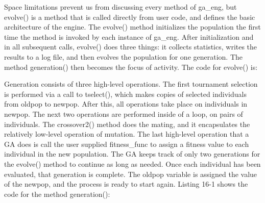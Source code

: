 Space limitations prevent us from discussing every method of
\textsf{ga\_eng}, but \textsf{evolve()} is a method that is called
directly from user code, and defines the basic architecture of the
engine. The \textsf{evolve()} method initializes the population the
first time the method is invoked by each instance of \textsf{ga\_eng}.
After initialization and in all subsequent calls, \textsf{evolve()}
does three things: it collects statistics, writes the results to a log
file, and then evolves the population for one generation. The method
\textsf{generation()} then becomes the focus of activity. The code for
\textsf{evolve()} is:


Generation consists of three high-level operations. The first tournament
selection is performed via a call to \textsf{tselect()}, which makes
copies of selected individuals from \textsf{oldpop} to
\textsf{newpop}.
After this, all operations take place on individuals in
\textsf{newpop}. The next two operations are performed inside of a
loop, on pairs of individuals. The \textsf{crossover2()} method does
the mating, and it encapsulates the relatively low-level operation of
mutation. The last high-level operation that a GA does is call the user
supplied \textsf{fitness\_func} to assign a fitness value to each
individual in the new population. The GA keeps track of only two
generations for the \textsf{evolve()} method to continue as long as
needed. Once each individual has been evaluated, that generation is
complete. The \textsf{oldpop} variable is assigned the value of the
\textsf{newpop}, and the process is ready to start again. Listing 16-1
shows the code for the method \textsf{generation()}:

